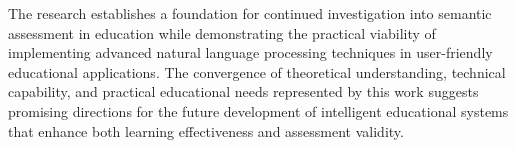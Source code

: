 {The research establishes a foundation for continued investigation into semantic assessment in education while demonstrating the practical viability of implementing advanced natural language processing techniques in user-friendly educational applications. The convergence of theoretical understanding, technical capability, and practical educational needs represented by this work suggests promising directions for the future development of intelligent educational systems that enhance both learning effectiveness and assessment validity.
}


